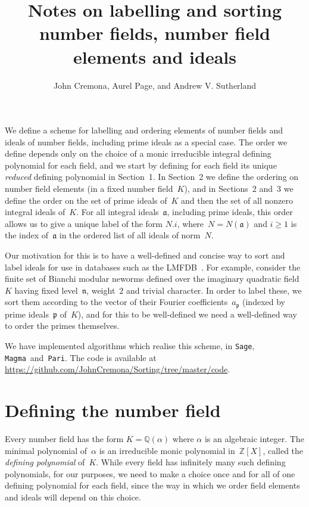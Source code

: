 \documentclass{article}
\title{Notes on labelling and sorting number fields, number field
  elements and ideals}
\author{John Cremona, Aurel Page, and Andrew V. Sutherland}
\def\Sage{{\tt Sage}}
\def\Magma{{\tt Magma}}
\def\Pari{{\tt Pari}}
\def\Z{{\mathbb Z}}
\def\Q{{\mathbb Q}}
\def\a{{\mathfrak a}}
\def\p{{\mathfrak p}}
\def\n{{\mathfrak n}}
\begin{document}
\maketitle

We define a scheme for labelling and ordering elements of number
fields and ideals of number fields, including prime ideals as a
special case.  The order we define depends only on the choice of a
monic irreducible integral defining polynomial for each field, and we
start by defining for each field its unique \emph{reduced} defining
polynomial in Section~1.  In Section~2 we define the ordering on
number field elements (in a fixed number field~$K$), and in Sections~2
and~3 we define the order on the set of prime ideals of~$K$ and then
the set of all nonzero integral ideals of~$K$.  For all integral
ideals~$\a$, including prime ideals, this order allows us to give a
unique label of the form $N.i$, where~$N=N(\a)$ and $i\ge1$ is the
index of~$\a$ in the ordered list of all ideals of norm~$N$.

Our motivation for this is to have a well-defined and concise way to
sort and label ideals for use in databases such as the
LMFDB~\cite{lmfdb}.  For example, consider the finite set of Bianchi
modular neworms defined over the imaginary quadratic field~$K$ having
fixed level~$\n$, weight~$2$ and trivial character.  In order to label
these, we sort them according to the vector of their Fourier
coefficients~$a_{\p}$ (indexed by prime ideals~$\p$ of~$K$), and for
this to be well-defined we need a well-defined way to order the primes
themselves.

We have implemented algorithms which realise this scheme, in \Sage,
\Magma\ and~\Pari.  The code is available at
\url{https://github.com/JohnCremona/Sorting/tree/master/code}.

\section{Defining the number field}
Every number field has the form $K=\Q(\alpha)$ where $\alpha$ is an
algebraic integer.  The minimal polynomial of~$\alpha$ is an
irreducible monic polynomial in~$\Z[X]$, called the \emph{defining
  polynomial} of~$K$.  While every field has infinitely many such
defining polynomials, for our purposes, we need to make a choice once
and for all of one defining polynomial for each field, since the way
in which we order field elements and ideals will depend on this
choice.
\end{document}

